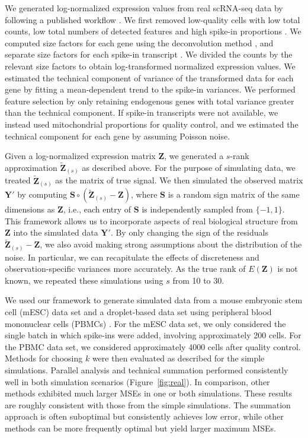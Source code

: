\documentclass[10pt,letterpaper]{article}
\begin{document}
We generated log-normalized expression values from real scRNA-seq data by following a published workflow \cite{lun2016stepbystep}.
We first removed low-quality cells with low total counts, low total numbers of detected features and high spike-in proportions \cite{mccarthy2017scater}.
We computed size factors for each gene using the deconvolution method \cite{lun2016pooling}, and separate size factors for each spike-in transcript \cite{lun2017assessing}.
We divided the counts by the relevant size factors to obtain log-transformed normalized expression values.
We estimated the technical component of variance of the transformed data for each gene by fitting a mean-dependent trend to the spike-in variances.
We performed feature selection by only retaining endogenous genes with total variance greater than the technical component.
If spike-in transcripts were not available, we instead used mitochondrial proportions for quality control,
and we estimated the technical component for each gene by assuming Poisson noise.  

Given a log-normalized expression matrix $\mathbf{Z}$, we generated a $s$-rank approximation $\mathbf{\tilde Z}_{(s)}$ as described above.
For the purpose of simulating data, we treated $\mathbf{\tilde Z}_{(s)}$ as the matrix of true signal.
We then simulated the observed matrix $\mathbf{Y}'$ by computing $\mathbf{S} \circ (\mathbf{\tilde Z}_{(s)} - \mathbf{Z})$,
where $\mathbf{S}$ is a random sign matrix of the same dimensions as $\mathbf{Z}$, i.e., each entry of $\mathbf{S}$ is independently sampled from $\{-1, 1\}$.
This framework allows us to incorporate aspects of real biological structure from $\mathbf{Z}$ into the simulated data $\mathbf{Y}'$.
By only changing the sign of the residuals $\mathbf{\tilde Z}_{(s)} - \mathbf{Z}$, we also avoid making strong assumptions about the distribution of the noise.
In particular, we can recapitulate the effects of discreteness and observation-specific variances more accurately.
As the true rank of $E(\mathbf{Z})$ is not known, we repeated these simulations using $s$ from 10 to 30.


We used our framework to generate simulated data from a mouse embryonic stem cell (mESC) data set \cite{kolod2015single} and a droplet-based data set using peripheral blood mononuclear cells (PBMCs) \cite{zheng2017massively}.
For the mESC data set, we only considered the single batch in which spike-ins were added, involving approximately 200 cells.
For the PBMC data set, we considered approximately 4000 cells after quality control.
Methods for choosing $k$ were then evaluated as described for the simple simulations.
Parallel analysis and technical summation performed consistently well in both simulation scenarios (Figure~\ref{fig:real}).
In comparison, other methods exhibited much larger MSEs in one or both simulations.
These results are roughly consistent with those from the simple simulations.
The summation approach is often suboptimal but consistently achieves low error, while other methods can be more frequently optimal but yield larger maximum MSEs.
\end{document}
